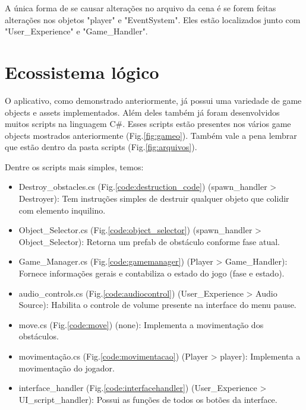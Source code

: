     A única forma de se causar alterações no arquivo da cena é se forem feitas alterações nos objetos "player" e "EventSystem".
    Eles estão localizados junto com "User\_Experience" e "Game\_Handler".




    \section{Ecossistema lógico}

    O aplicativo, como demonstrado anteriormente, já possui uma variedade de game objects e assets implementados.
    Além deles também já foram desenvolvidos muitos scripts na linguagem C\#.
    Esses scripts estão presentes nos vários game objects mostrados anteriormente (Fig.\ref{fig:gameo}). 
    Também vale a pena lembrar que estão dentro da pasta scripts (Fig.\ref{fig:arquivos}).

    Dentre os scripts mais simples, temos:

    \begin{itemize}

        \item Destroy\_obstacles.cs (Fig.\ref{code:destruction_code}) (spawn\_handler > Destroyer): Tem instruções simples de destruir qualquer objeto que colidir com elemento inquilino.

        \item Object\_Selector.cs (Fig.\ref{code:object_selector}) (spawn\_handler > Object\_Selector): Retorna um prefab de obstáculo conforme fase atual.

        \item Game\_Manager.cs (Fig.\ref{code:gamemanager}) (Player > Game\_Handler): Fornece informações gerais e contabiliza o estado do jogo (fase e estado).

        \item audio\_controls.cs (Fig.\ref{code:audiocontrol}) (User\_Experience > Audio Source): Habilita o controle de volume presente na interface do menu pause.
        
        \item move.cs (Fig.\ref{code:move}) (none): Implementa a movimentação dos obstáculos.

        \item movimentação.cs (Fig.\ref{code:movimentacao}) (Player > player): Implementa a movimentação do jogador.

        \item interface\_handler (Fig.\ref{code:interfacehandler}) (User\_Experience > UI\_script\_handler): Possui as funções de todos os botões da interface.

    \end{itemize}



